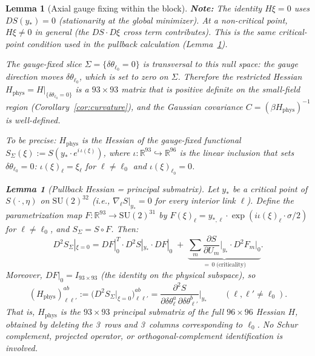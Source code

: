 \documentclass[11pt]{article}
\newtheorem{lemma}[theorem]{Lemma}
\theoremstyle{definition}
\newcommand{\SU}{\mathrm{SU}}
\newcommand{\R}{\mathbb{R}}
\begin{document}
\begin{lemma}[Axial gauge fixing within the block]
\textbf{Note:} The identity $H\xi=0$ uses $DS(y_*)=0$
(stationarity at the global minimizer).  At a non-critical point,
$H\xi\ne 0$ in general (the $DS\cdot D\xi$ cross term
contributes).  This is the same critical-point condition used in
the pullback calculation (Lemma~\ref{lem:pullback-hessian}).

The gauge-fixed slice $\Sigma=\{\delta\theta_{\ell_0}=0\}$ is
transversal to this null space: the gauge direction moves
$\delta\theta_{\ell_0}$, which is set to zero on $\Sigma$.
Therefore the restricted Hessian
$H_{\mathrm{phys}}=H|_{\{\delta\theta_{\ell_0}=0\}}$ is a
$93\times 93$ matrix that is positive definite on the small-field
region (Corollary~\ref{cor:curvature}), and the Gaussian covariance
$C=(\beta H_{\mathrm{phys}})^{-1}$ is well-defined.

To be precise: $H_{\mathrm{phys}}$ is the Hessian of the
gauge-fixed functional $S_\Sigma(\xi):=S(y_*\cdot e^{i\,\iota(\xi)})$,
where $\iota:\R^{93}\hookrightarrow\R^{96}$ is the \emph{linear}
inclusion that sets $\delta\theta_{\ell_0}=0$:
$\iota(\xi)_\ell=\xi_\ell$ for $\ell\ne\ell_0$ and
$\iota(\xi)_{\ell_0}=0$.

\begin{lemma}[Pullback Hessian = principal submatrix]%
\label{lem:pullback-hessian}
Let $y_*$ be a critical point of
$S(\cdot\,,\eta)$ on $\SU(2)^{32}$ (i.e.,
$\nabla_\ell S|_{y_*}=0$ for every interior link $\ell$).
Define the parametrization map $F:\R^{93}\to\SU(2)^{31}$ by
$F(\xi)_\ell=y_{*,\ell}\cdot\exp(i\iota(\xi)_\ell\cdot\sigma/2)$
for $\ell\ne\ell_0$, and $S_\Sigma=S\circ F$.
Then:
\begin{equation}\label{eq:hessian-pullback}
D^2 S_\Sigma|_{\xi=0}
=DF|_0^T\cdot D^2 S|_{y_*}\cdot DF|_0
\;+\;\underbrace{\sum_m\frac{\partial S}{\partial U_m}\bigg|_{y_*}
\cdot D^2 F_m|_0}_{=\,0\;\text{(criticality)}}.
\end{equation}
Moreover, $DF|_0=I_{93\times 93}$ (the identity on the physical
subspace), so
\begin{equation}\label{eq:Hphys-submatrix}
(H_{\mathrm{phys}})_{\ell\ell'}^{ab}
:=\bigl(D^2 S_\Sigma|_{\xi=0}\bigr)_{\ell\ell'}^{ab}
=\frac{\partial^2 S}{\partial\delta\theta_\ell^a\,
\partial\delta\theta_{\ell'}^b}\bigg|_{y_*}
\qquad(\ell,\ell'\ne\ell_0).
\end{equation}
That is, $H_{\mathrm{phys}}$ is the $93\times 93$
\emph{principal submatrix} of the full $96\times 96$ Hessian
$H$, obtained by deleting the 3~rows and 3~columns
corresponding to $\ell_0$.  No Schur complement, projected
operator, or orthogonal-complement identification is involved.
\end{lemma}


\end{lemma}
\end{document}
